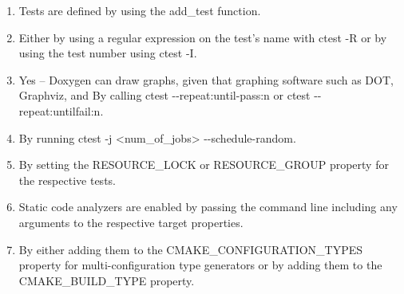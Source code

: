 

\begin{enumerate}
\item 
Tests are defined by using the add\_test function.

\item
Either by using a regular expression on the test's name with ctest -R or by using the test number using ctest -I.

\item 
Yes – Doxygen can draw graphs, given that graphing software such as DOT, Graphviz, and By calling ctest -{}-repeat:until-pass:n or ctest -{}-repeat:untilfail:n.

\item 
By running ctest -j <num\_of\_jobs> -{}-schedule-random.

\item 
By setting the RESOURCE\_LOCK or RESOURCE\_GROUP property for the respective tests.

\item 
Static code analyzers are enabled by passing the command line including any arguments to the respective target properties.

\item 
By either adding them to the CMAKE\_CONFIGURATION\_TYPES property for multi-configuration type generators or by adding them to the CMAKE\_BUILD\_TYPE property.
\end{enumerate}